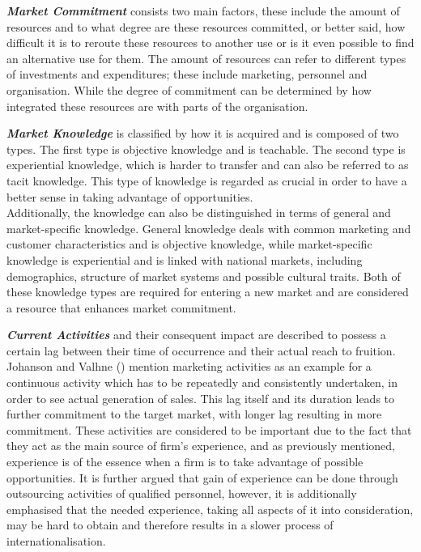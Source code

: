 \documentclass[11pt,a4paper]{article}
\begin{document}
 
\textbf{\textit{Market Commitment}} consists two main factors, these include the amount of resources and to what degree are these resources committed, or better said, how difficult it is to reroute these resources to another use or is it even possible to find an alternative use for them. The amount of resources can refer to different types of investments and expenditures; these include marketing, personnel and organisation. While the degree of commitment can be determined by how integrated these resources are with parts of the organisation. \par
\textbf{\textit{Market Knowledge}} is classified by how it is acquired and is composed of two types. The first type is objective knowledge and is teachable. The second type is experiential knowledge, which is harder to transfer and can also be referred to as tacit knowledge. This type of knowledge is regarded as crucial in order to have a better sense in taking advantage of opportunities. \\
Additionally, the knowledge can also be distinguished in terms of general and market-specific knowledge. General knowledge deals with common marketing and customer characteristics and is objective knowledge, while market-specific knowledge is experiential and is linked with national markets, including demographics, structure of market systems and possible cultural traits. Both of these knowledge types are required for entering a new market and are considered a resource that enhances market commitment. \par
\textbf{\textit{Current Activities}} and their consequent impact are described to possess a certain lag between their time of occurrence and their actual reach to fruition. Johanson and Valhne (\citeyear{johansonInternationalizationProcessFirm1977}) mention marketing activities as an example for a continuous activity which has to be repeatedly and consistently undertaken, in order to see actual generation of sales. This lag itself and its duration leads to further commitment to the target market, with longer lag resulting in more commitment. These activities are considered to be important due to the fact that they act as the main source of firm's experience, and as previously mentioned, experience is of the essence when a firm is to take advantage of possible opportunities. It is further argued that gain of experience can be done through outsourcing activities of qualified personnel, however, it is additionally emphasised that the needed experience, taking all aspects of it into consideration, may be hard to obtain and therefore results in a slower process of internationalisation. \par
\end{document}
